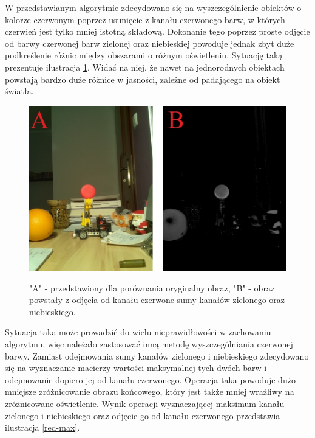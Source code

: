 W przedstawianym algorytmie zdecydowano się na wyszczególnienie obiektów o kolorze czerwonym poprzez usunięcie z kanału czerwonego barw, w których czerwień jest tylko mniej istotną składową. Dokonanie tego poprzez proste odjęcie od barwy czerwonej barw zielonej oraz niebieskiej powoduje jednak zbyt duże podkreślenie różnic między obszarami o różnym oświetleniu. Sytuację taką prezentuje ilustracja \ref{red-b+g}. Widać na niej, że nawet na jednorodnych obiektach powstają bardzo duże różnice w jasności, zależne od padającego na obiekt światła.\newpage
\begin{figure}[H]
\begin{center}
\includegraphics[scale=0.42]{imgs/imgBase+sumBG.jpg}
\caption[Kanał czerwony minus zielony oraz niebieski.]\small{"A" - przedstawiony dla porównania oryginalny obraz, "B" - obraz powstały z odjęcia od kanału czerwone sumy kanałów zielonego oraz niebieskiego.}
\label{red-b+g}
\end{center}
\end{figure}
Sytuacja taka może prowadzić do wielu nieprawidłowości w zachowaniu algorytmu, więc należało zastosować inną metodę wyszczególniania czerwonej barwy. Zamiast odejmowania sumy kanałów zielonego i niebieskiego zdecydowano się na wyznaczanie macierzy wartości maksymalnej tych dwóch barw i odejmowanie dopiero jej od kanału czerwonego. Operacja taka powoduje dużo mniejsze zróżnicowanie obrazu końcowego, który jest także mniej wrażliwy na zróżnicowane oświetlenie. Wynik operacji wyznaczającej maksimum kanału zielonego i niebieskiego oraz odjęcie go od kanału czerwonego przedstawia ilustracja \ref{red-max}.\newpage
